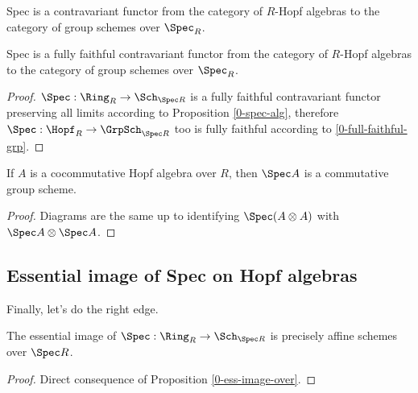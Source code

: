 \begin{definition}
  \label{0-spec-hopf}
  \leanok

  Spec is a contravariant functor from the category of $R$-Hopf algebras to the category of group schemes over $\Spec_R$.
\end{definition}


\begin{proposition}
  \label{0-full-faithful-spec-hopf}
  \leanok

  Spec is a fully faithful contravariant functor from the category of $R$-Hopf algebras to the category of group schemes over $\Spec_R$.
\end{proposition}
\begin{proof}
  \leanok

  $\Spec : \Ring_R \to \Sch_{\Spec R}$ is a fully faithful contravariant functor preserving all limits according to Proposition \ref{0-spec-alg}, therefore $\Spec : \Hopf_R \to \GrpSch_{\Spec R}$ too is fully faithful according to \ref{0-full-faithful-grp}.
\end{proof}


\begin{proposition}
  \label{0-spec-cocomm-hopf}
  \leanok

  If $A$ is a cocommutative Hopf algebra over $R$, then $\Spec A$ is a commutative group scheme.
\end{proposition}
\begin{proof}
  \uses{}
  \leanok

  Diagrams are the same up to identifying $\Spec (A \otimes A)$ with $\Spec A \otimes \Spec A$.
\end{proof}


\subsection{Essential image of Spec on Hopf algebras}


Finally, let's do the right edge.


\begin{proposition}
  \label{0-ess-image-spec-alg}
  \leanok

  The essential image of $\Spec : \Ring_R \to \Sch_{\Spec R}$ is precisely affine schemes over $\Spec R$.
\end{proposition}
\begin{proof}
  \leanok

  Direct consequence of Proposition \ref{0-ess-image-over}.
\end{proof}


